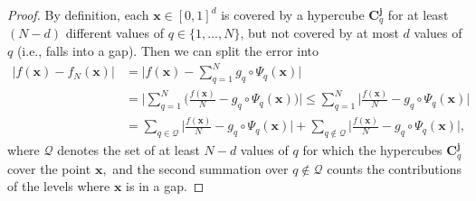 \documentclass[10pt,reqno,final]{amsart}
\theoremstyle{remark}
\theoremstyle{definition}
\newcommand{\bs}[1]{\boldsymbol{#1}}
\begin{document}
\begin{proof} 
By definition,  each $\bs x\in [0,1]^d$ is covered by a hypercube   
$\bs C_q^{\bs j}$ for  at least $(N-d)$ different values of $q\in\{1,\ldots, N\}$, but not covered by at most $d$ values of $q$ (i.e., falls into a gap). 
Then we can split the error into 
\begin{equation}\label{ffNas}
\begin{aligned}
|f(\bs x)-f_N(\bs x)|& = \Big|f(\bs{x})-\sum_{q=1}^N g_q\circ\Psi_q(\bs{x})\Big|\\
& =
\Big|\sum_{q=1}^N \Big(\frac {f(\bs{x})} N- g_q\circ\Psi_q(\bs{x})\Big)\Big| \leq \sum_{q=1}^N\Big|\frac{f(\bs x)}{N}-g_q\circ\Psi_q(\bs x)\Big| \\
& =  \sum_{q\in {\mathcal Q}}\Big|\frac{f(\bs x)}{N}-g_q\circ\Psi_q(\bs x)\Big|+\sum_{q\not\in {\mathcal Q}}\Big|\frac{f(\bs x)}{N}-g_q\circ\Psi_q(\bs x)\Big|,
\end{aligned}
\end{equation}
where  ${\mathcal Q}$ denotes the set of at least $N-d$ values of $q$ for which the hypercubes $\bs C_q^{\bs{j}}$ cover the point $\bs x,$ and the second summation over $q\not\in {\mathcal Q}$ counts the contributions of the levels where $\bs x$ is in a gap.  


\end{proof}
\end{document}
